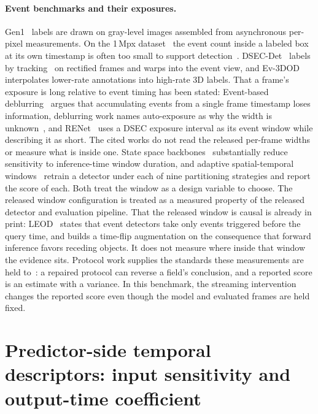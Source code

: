 \documentclass[10pt,twocolumn,letterpaper]{article}
\begin{document}
\paragraph{Event benchmarks and their exposures.}
Gen1~\cite{detournemire2020gen1} labels are drawn on gray-level images assembled
from asynchronous per-pixel measurements. On the 1\,Mpx
dataset~\cite{perot2020megapixel} the event count inside a labeled box at its own
timestamp is often too small to support detection~\cite{kugele2023howmany}.
DSEC-Det~\cite{gehrig2024lowlatency} labels by tracking~\cite{pang2021qdtrack} on
rectified frames and warps into the event view, and
Ev-3DOD~\cite{cho2025ev3dod} interpolates lower-rate annotations into high-rate
3D labels. That a frame's exposure is long relative to event timing has been
stated: Event-based deblurring~\cite{sun2023refid} argues that accumulating events from a single
frame timestamp loses information, deblurring work names auto-exposure as why the
width is unknown~\cite{kim2022unknownexposure}, and RENet~\cite{zhou2022renet}
uses a DSEC exposure interval as its event window while describing it as short.
The cited works do not read the released per-frame widths or measure what is
inside one. State space backbones~\cite{zubic2024ssm} substantially reduce sensitivity to
inference-time window duration, and
adaptive spatial-temporal windows~\cite{sui2026astw} retrain a detector under
each of nine partitioning strategies and report the score of each. Both treat the
window as a design variable to choose. The released window configuration is
treated as a measured property of the released detector and evaluation pipeline.
That the released window is causal is already in print:
LEOD~\cite{wu2024leod} states that event detectors take only events triggered
before the query time, and builds a time-flip augmentation on the consequence
that forward inference favors receding objects. It does not measure where inside
that window the evidence sits. Protocol
work supplies the standards these measurements are held
to~\cite{oncalibration2024,stratification2024,northcutt2021labelerrors,ercan2023evreal}:
a repaired protocol can reverse a field's conclusion, and a reported score is
an estimate with a variance. In this benchmark, the streaming intervention changes the
reported score even though the model and evaluated frames are held fixed.

\fi
\section{Predictor-side temporal descriptors: input sensitivity and output-time coefficient}
\label{sec:predictor}
\end{document}
